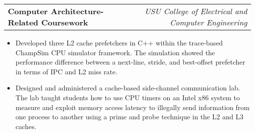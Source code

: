 \documentclass[letterpaper,12pt]{article}
\makeatletter
\newcommand{\simpleHeading}[2]{
    \vspace{-1pt}
    \begin{tabular*}{0.99\textwidth}[t]{l@{\extracolsep{\fill}}r}
        #1 & #2 \\
    \end{tabular*}
}
\newcommand{\positionHeading}[4]{
    \simpleHeading{\textbf{#1}}{\textit{#2}}
    \simpleHeading{\textit{#3}}{\textit{#4}}
}
\newcommand{\simpleParagraph}[1]{
    \vspace{-1pt}
    \begin{adjustwidth}{7pt}{0pt}
        #1
    \end{adjustwidth}
}
\makeatother
\begin{document}



    \vspace{10pt}
    \simpleHeading{\textbf{Computer Architecture-Related Coursework}}
                  {\textit{USU College of Electrical and Computer Engineering}}

    \simpleParagraph{
        \begin{itemize}
            \item Developed three L2 cache prefetchers in C++ within the trace-based ChampSim CPU
                simulator framework. The simulation showed the performance difference between a next-line, stride,
                and best-offset prefetcher in terms of IPC and L2 miss rate.


            \item Designed and administered a cache-based side-channel communication lab. The lab taught
                students how to use CPU timers on an Intel x86 system to measure and exploit memory access 
                latency to illegally send information from one process to another using a prime and probe 
                technique in the L2 and L3 caches.

        \end{itemize}
    }

    
\end{document}

